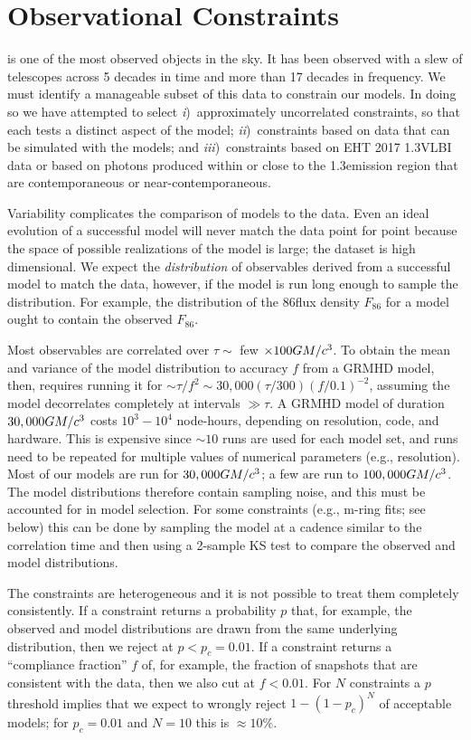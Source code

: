 \section{Observational Constraints}\label{sec:observations}

\sgra is one of the most observed objects in the sky.  It has been observed with a slew of telescopes across 5 decades in time and more than 17 decades in frequency. We must identify a manageable subset of this data to constrain our models. In doing so we have attempted to select
\emph{i})~approximately uncorrelated constraints, so that each tests a distinct aspect of the model;
\emph{ii})~constraints based on data that can be simulated with the models; and
\emph{iii})~constraints based on EHT 2017 1.3\mm VLBI data or based on photons produced within or close to the 1.3\mm emission region that are contemporaneous or near-contemporaneous.

Variability complicates the comparison of \sgra models to the data. Even an ideal evolution of a successful model will never match the data point for point because the space of possible realizations of the model is large; the dataset is high dimensional.  We expect the {\em distribution} of  observables derived from a successful model to match the data, however, if the model is run long enough to sample the distribution.  For example, the distribution of the 86\GHz flux density $F_{86}$ for a model ought to contain the observed $F_{86}$.

Most observables are correlated over $\tau\sim$ few $\times 100 GM/c^3$.  To obtain the mean and variance of the model distribution to accuracy $f$ from a GRMHD model, then, requires running it for $\sim \tau/f^2 \sim 30,000 (\tau/300) (f/0.1)^{-2}$, assuming the model decorrelates completely at intervals $\gg \tau$.  A GRMHD model of duration $30,000 GM/c^3$  costs $10^3-10^4$ node-hours, depending on resolution, code, and hardware.  This is expensive since $\sim 10$ runs are used for each model set, and runs need to be repeated for multiple values of numerical parameters (e.g., resolution).  Most of our models are run for $30,000 GM/c^3$; a few are run to $100,000 GM/c^3$.  The model distributions therefore contain sampling noise, and this must be accounted for in model selection.  For some  constraints (e.g., m-ring fits; see below) this can be done by sampling the model at a cadence similar to the correlation time and then using a 2-sample KS test to compare the observed and model distributions.

The constraints are heterogeneous and it is not possible to treat them completely consistently.  If a constraint returns a probability $p$ that, for example, the observed and model distributions are drawn from the same underlying distribution, then we reject at $p < p_c = 0.01$.  If a constraint returns a ``compliance fraction'' $f$ of, for example, the fraction of snapshots that are consistent with the data, then we also cut at $f < 0.01$.  For $N$ constraints a $p$ threshold implies that we expect to wrongly reject $1 - (1 - p_c)^N$ of acceptable models; for $p_c = 0.01$ and $N = 10$ this is $\approx 10\%$.

